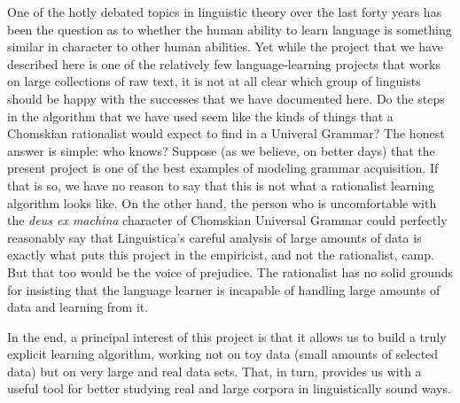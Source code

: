 \documentclass[output=paper,colorlinks,citecolor=brown]{langscibook}
\begin{document}
One of the hotly debated topics in linguistic theory over the last forty years has been the question as to whether the human ability to learn language is something similar in character to other human abilities. Yet while the project that we have described here is one of the relatively few language-learning projects that works on large collections of raw text, it is not at all clear which group of linguists should be happy with the successes that we have documented here. Do the steps in the algorithm that we have used seem like the kinds of things that a Chomskian rationalist would expect to find in a Univeral Grammar? The honest answer is simple: who knows? Suppose (as we believe, on better days) that the present project is one of the best examples of modeling grammar acquisition. If that is so, we have no reason to say that this is not what a rationalist learning algorithm looks like. On the other hand, the person who is uncomfortable with the \textit{deus ex machina} character of Chomskian Universal Grammar could perfectly reasonably say that Linguistica's careful analysis of large amounts of data is exactly what puts this project in the empiricist, and not the rationalist, camp. But that too would be the voice of prejudice. The rationalist has no solid grounds for insisting that the language learner is incapable of handling large amounts of data and learning from it. 

In the end, a principal interest of this project is that it allows us to build a truly explicit learning algorithm, working not on toy data (small amounts of selected data) but on very large and real data sets. That, in turn, provides us with a useful tool for better studying real and large corpora in linguistically sound ways. 

{\sloppy\printbibliography[heading=subbibliography,notkeyword=this]}
\end{document}
